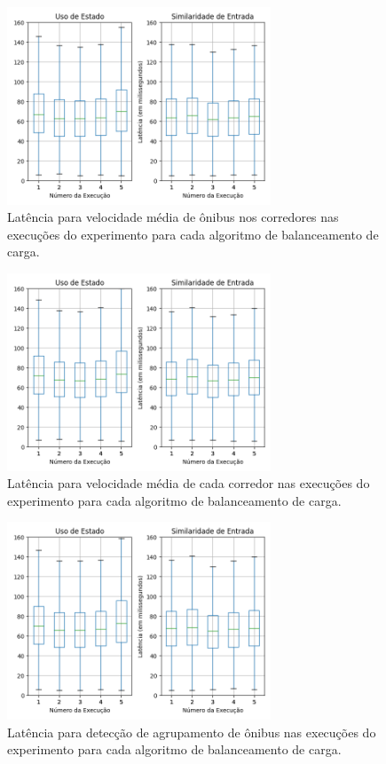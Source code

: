 \begin{figure}[ht]
  \centering
\includegraphics[width=0.7\textwidth]{figuras/graphics/boxplot_agg_vel.png}
\caption{Latência para velocidade média de ônibus nos corredores nas execuções do experimento para cada algoritmo de balanceamento de carga.}
\label{fig:boxplot_vel_agg}
\end{figure}

\begin{figure}[ht]
\centering
\includegraphics[width=0.7\textwidth]{figuras/graphics/boxplot_agg_corr.png}
 \caption{Latência para velocidade média de cada corredor nas execuções do experimento para cada algoritmo de balanceamento de carga.}
 \label{fig:boxplot_corr_agg}
\end{figure}


\afterpage{\clearpage}

\begin{figure}[ht]

  \centering
\includegraphics[width=0.7\textwidth]{figuras/graphics/boxplot_agg_BusB.png}
\caption{Latência para detecção de agrupamento de ônibus nas execuções do experimento para cada algoritmo de balanceamento de carga.}
\label{fig:boxplot_BusB_agg}

\end{figure}

